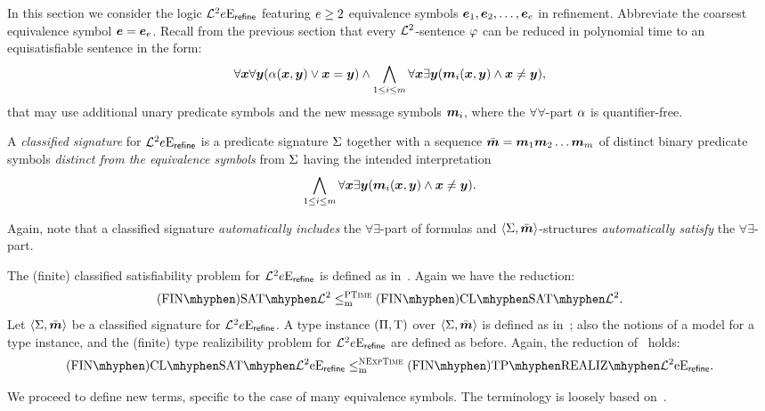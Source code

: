 In this section we consider the logic $\mathcal{L}^{2}_{{}}{e}\mathrm{E}_{\mathsf{refine}}$
featuring $e \geq 2$ equivalence symbols $\bm{e}_{1},\bm{e}_{2},\dots,\bm{e}_{e}$ in
refinement. Abbreviate the coarsest equivalence symbol $\bm{e} = \bm{e}_{e}$.
Recall from the previous section that every $\mathcal{L}^{2}$-sentence $\varphi$ can be
reduced in polynomial time to an equisatisfiable sentence in the form:
\begin{equation*}
  \forall\bm{x}\forall\bm{y} (\alpha(\bm{x},\bm{y}) \lor \bm{x} = \bm{y}) \land
  \bigwedge_{1 \leq i \leq m} \forall\bm{x}\exists\bm{y}
  (\bm{m}_{i}(\bm{x},\bm{y}) \land \bm{x} \neq \bm{y}),
\end{equation*}
that may use additional unary predicate symbols and the new message symbols
$\bm{m}_{i}$, where the $\forall\forall$-part $\alpha$ is quantifier-free.
\begin{definition}
A \emph{classified signature} for $\mathcal{L}^{2}_{{}}{e}\mathrm{E}_{\mathsf{refine}}$ is a
predicate signature $\mathrm{\Sigma}$ together with a sequence $\sms =
\smm1\smm2\dots\smm\nm$ of distinct binary predicate symbols \emph{distinct
from the equivalence symbols} from $\mathrm{\Sigma}$ having the intended interpretation
\begin{equation*}
  \bigwedge_{1 \leq i \leq m} \forall\bm{x}\exists\bm{y} 
  (\bm{m}_{i}(\bm{x},\bm{y}) \land \bm{x} \neq \bm{y}).
\end{equation*}
\end{definition}
Again, note that a classified signature \emph{automatically includes} the
$\forall\exists$-part of formulas and $\left\langle \mathrm{\Sigma},\bar{\bm{m}} \right\rangle$-structures
\emph{automatically satisfy} the $\forall\exists$-part.

The (finite) classified satisfiability problem for
$\mathcal{L}^{2}_{{}}{e}\mathrm{E}_{\mathsf{refine}}$ is defined as in~.
Again we have the reduction:
\[
  \FinASat{\vFo2} \red\cP \FinAClSat{\vFo2}.
\]
Let $\left\langle \mathrm{\Sigma},\bar{\bm{m}} \right\rangle$ be a classified signature for
$\mathcal{L}^{2}_{{}}{e}\mathrm{E}_{\mathsf{refine}}$.
A type instance $(\Pi,\mathrm{T})$ over $\left\langle \mathrm{\Sigma},\bar{\bm{m}} \right\rangle$ is defined as
in~; also the notions of a model for a type instance,
and the (finite) type realizibility problem for
$\mathcal{L}^{2}_{{}}{e}\mathrm{E}_{\mathsf{refine}}$ are defined as before. 
Again, the reduction of~ holds:
\[
  \FinAClSat{\Lvp\Fo2\nopow\Eea\sze\agrefine} \red\cNExpTime
  \FinAReal{\Lvp\Fo2\nopow\Eea\sze\agrefine}.
\]

We proceed to define new terms, specific to the case of many equivalence
symbols.
The terminology is loosely based on~\cite{MALQ:MALQ201400102}.

